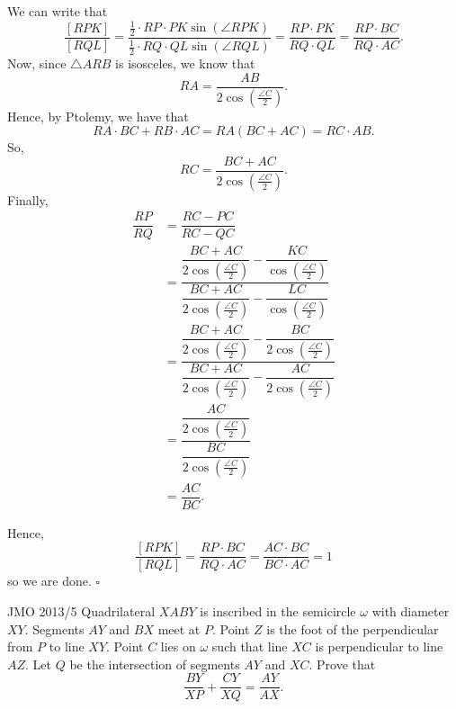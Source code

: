 \documentclass{article}
\begin{document}
We can write that \[\dfrac{[RPK]}{[RQL]} = \dfrac{\tfrac{1}{2}\cdot RP\cdot PK\sin(\angle RPK)}{\tfrac{1}{2}\cdot RQ\cdot QL\sin(\angle RQL)} = \dfrac{RP\cdot PK}{RQ\cdot QL} = \dfrac{RP\cdot BC}{RQ\cdot AC}.\] Now, since $\triangle ARB$ is isosceles, we know that \[RA = \dfrac{AB}{2\cos\left(\tfrac{\angle C}{2}\right)}.\] Hence, by Ptolemy, we have that \[RA\cdot BC+RB\cdot AC = RA(BC+AC) = RC\cdot AB.\] So, \[RC = \dfrac{BC+AC}{2\cos\left(\tfrac{\angle C}{2}\right)}.\] Finally, 
{\allowdisplaybreaks
\begin{align*}
\dfrac{RP}{RQ} &= \dfrac{RC-PC}{RC-QC} \\[0.5em]
&= \dfrac{\dfrac{BC+AC}{2\cos\left(\tfrac{\angle C}{2}\right)}-\dfrac{KC}{\cos\left(\tfrac{\angle C}{2}\right)}}{\dfrac{BC+AC}{2\cos\left(\tfrac{\angle C}{2}\right)}-\dfrac{LC}{\cos\left(\tfrac{\angle C}{2}\right)}} \\[0.5em]
&= \dfrac{\dfrac{BC+AC}{2\cos\left(\tfrac{\angle C}{2}\right)}-\dfrac{BC}{2\cos\left(\tfrac{\angle C}{2}\right)}}{\dfrac{BC+AC}{2\cos\left(\tfrac{\angle C}{2}\right)}-\dfrac{AC}{2\cos\left(\tfrac{\angle C}{2}\right)}} \\[0.5em]
&= \dfrac{\dfrac{AC}{2\cos\left(\tfrac{\angle C}{2}\right)}}{\dfrac{BC}{2\cos\left(\tfrac{\angle C}{2}\right)}} \\[0.5em]
&= \dfrac{AC}{BC}.
\end{align*}
}

Hence, \[\dfrac{[RPK]}{[RQL]} = \dfrac{RP\cdot BC}{RQ\cdot AC} = \dfrac{AC\cdot BC}{BC\cdot AC} = 1\] so we are done. $\square$

\begin{problem}[5.25]{JMO 2013/5}
Quadrilateral $XABY$ is inscribed in the semicircle $\omega$ with diameter $XY$.  Segments $AY$ and $BX$ meet at $P$.  Point $Z$ is the foot of the perpendicular from $P$ to line $XY$.  Point $C$ lies on $\omega$ such that line $XC$ is perpendicular to line $AZ$.  Let $Q$ be the intersection of segments $AY$ and $XC$.  Prove that \[\dfrac{BY}{XP}+\dfrac{CY}{XQ}=\dfrac{AY}{AX}.\]
\end{problem}
\end{document}
